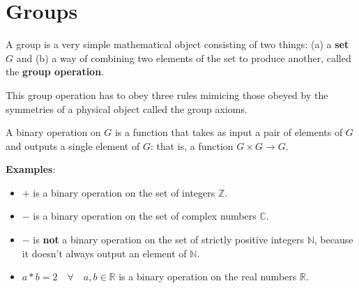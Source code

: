 \section{Groups}

A group is a very simple mathematical object consisting of two things: (a) a \textbf{set} $G$ and (b) a way of combining two elements of the set to produce another, called the \textbf{group operation}.

This group operation has to obey three rules mimicing those obeyed by the symmetries of a physical object called the group axioms.


A binary operation on $G$ is a function that takes as input a pair of elements of $G$ and outputs a single element of $G$: that is, a function $G \times G \rightarrow G$.

\textbf{Examples}:

\begin{itemize}
    \item $+$ is a binary operation on the set of integers $\mathbb{Z}$.
    \item $-$ is a binary operation on the set of complex numbers $\mathbb{C}$.
    \item $-$ is \textbf{not} a binary operation on the set of strictly positive integers $\mathbb{N}$, because it doesn't always output an element of $\mathbb{N}$.
    \item $a * b = 2 \quad \forall \quad a, b \in \mathbb{R}$ is a binary operation on the real numbers $\mathbb{R}$.
\end{itemize}

